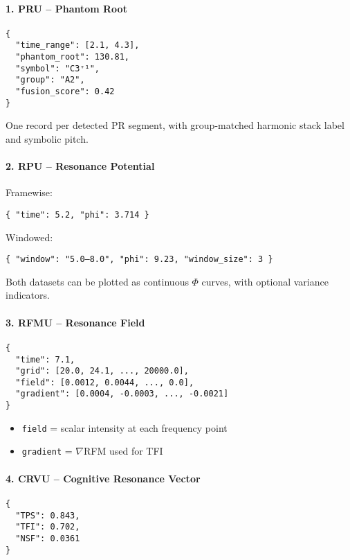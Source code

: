 \paragraph{1. PRU – Phantom Root}
\begin{verbatim}
{
  "time_range": [2.1, 4.3],
  "phantom_root": 130.81,
  "symbol": "C3⁺¹",
  "group": "A2",
  "fusion_score": 0.42
}
\end{verbatim}

One record per detected PR segment, with group-matched harmonic stack label and symbolic pitch.

\paragraph{2. RPU – Resonance Potential}

Framewise:
\begin{verbatim}
{ "time": 5.2, "phi": 3.714 }
\end{verbatim}

Windowed:
\begin{verbatim}
{ "window": "5.0–8.0", "phi": 9.23, "window_size": 3 }
\end{verbatim}

Both datasets can be plotted as continuous $\Phi$ curves, with optional variance indicators.

\paragraph{3. RFMU – Resonance Field}
\begin{verbatim}
{
  "time": 7.1,
  "grid": [20.0, 24.1, ..., 20000.0],
  "field": [0.0012, 0.0044, ..., 0.0],
  "gradient": [0.0004, -0.0003, ..., -0.0021]
}
\end{verbatim}

\begin{itemize}
    \item \texttt{field} = scalar intensity at each frequency point
    \item \texttt{gradient} = $\nabla$RFM used for TFI
\end{itemize}

\paragraph{4. CRVU – Cognitive Resonance Vector}
\begin{verbatim}
{
  "TPS": 0.843,
  "TFI": 0.702,
  "NSF": 0.0361
}
\end{verbatim}

